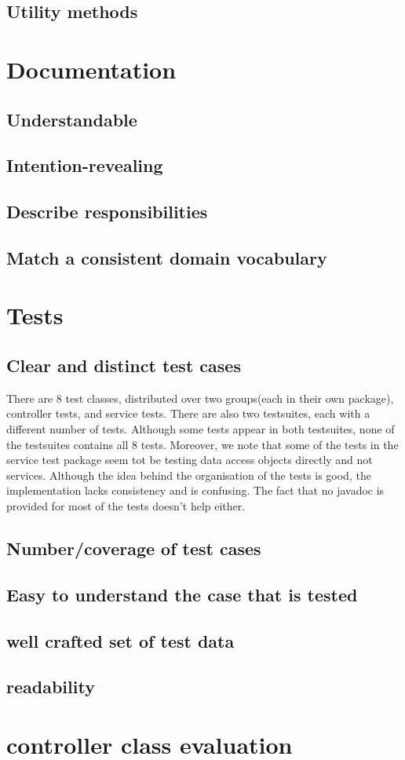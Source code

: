\documentclass[a4wide]{article}
\begin{document}
\subsection{Utility methods}
\section{Documentation}
\subsection{Understandable}
\subsection{Intention-revealing}
\subsection{Describe responsibilities}
\subsection{Match a consistent domain vocabulary}
\section{Tests}
\subsection{Clear and distinct test cases}
There are 8 test classes, distributed over two groups(each in their own package), controller tests, and service tests. There are also two testsuites, each with a different number of tests. Although some tests appear in both testsuites, none of the testsuites contains all 8 tests. Moreover, we note that some of the tests in the service test package seem tot be testing data access objects directly and not services. Although the idea behind the organisation of the tests is good, the implementation lacks consistency and is confusing. The fact that no javadoc is provided for most of the tests doesn't help either. 
\subsection{Number/coverage of test cases}
\subsection{Easy to understand the case that is tested}
\subsection{well crafted set of test data}
\subsection{readability}
\section{controller class evaluation}
\end{document}
